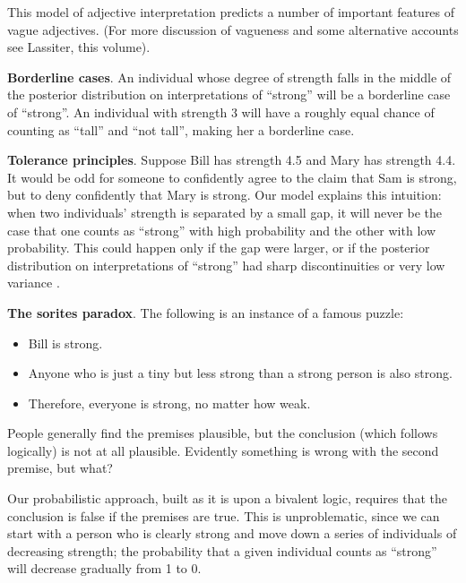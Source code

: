 \documentclass[pdfextras]{handbook}
\begin{document}
This model of adjective interpretation predicts a number of important features of vague adjectives. 
(For more discussion of vagueness and some alternative accounts see Lassiter, this volume).

\textbf{Borderline cases}. An individual whose degree of strength falls in the middle of the posterior distribution on interpretations of ``strong'' will be a borderline case of ``strong''. 
An individual with strength 3 will have a roughly equal chance of counting as ``tall'' and ``not tall'', making her a borderline case.  
 
\textbf{Tolerance principles}. Suppose Bill has strength 4.5 and Mary has strength 4.4. It would be odd for someone to confidently agree to the claim that Sam is strong, but to deny confidently that Mary is strong. 
Our model explains this intuition: when two individuals' strength is separated by a small gap, it will never be the case that one counts as ``strong'' with high probability and the other with low probability. 
This could happen only if the gap were larger, or if the posterior distribution on interpretations of ``strong'' had sharp discontinuities or very low variance \citep{lassitergoodman13}. 

\textbf{The sorites paradox}. The following is an instance of a famous puzzle:
\begin{itemize}
\item Bill is strong.
\item Anyone who is just a tiny but less strong than a strong person is also strong.
\item Therefore, everyone is strong, no matter how weak.
\end{itemize}
People generally find the premises plausible, but the conclusion (which follows logically) is not at all plausible. Evidently something is wrong with the second premise, but what? 

Our probabilistic approach, built as it is upon a bivalent logic, requires that the conclusion is false if the premises are true. 
This is unproblematic, since we can start with a person who is clearly strong and move down a series of individuals of decreasing strength; the probability that a given individual counts as ``strong'' will decrease gradually from 1 to 0. 
\end{document}
